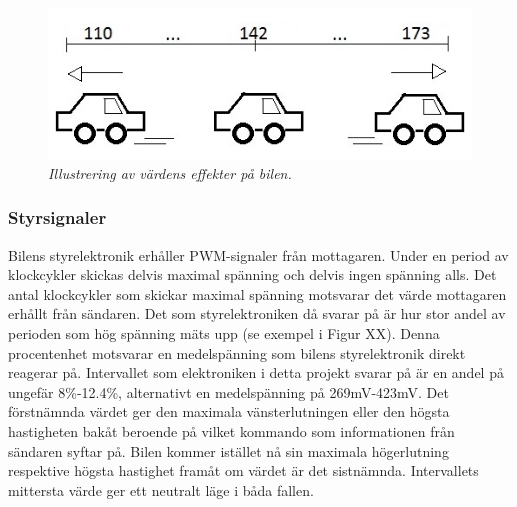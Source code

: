 \documentclass[a4paper]{article}
\begin{document}

\begin{figure}[H]
\includegraphics[scale=1]{110-173Car.jpg}
\centering
\caption{\it Illustrering av värdens effekter på bilen.}
\end{figure} 




\subsubsection{Styrsignaler}

Bilens styrelektronik erhåller PWM-signaler från mottagaren. Under en period av klockcykler skickas delvis maximal spänning och delvis ingen spänning alls. Det antal klockcykler som skickar maximal spänning motsvarar det värde mottagaren erhållt från sändaren. Det som styrelektroniken då svarar på är hur stor andel av perioden som hög spänning mäts upp (se exempel i Figur XX). Denna procentenhet motsvarar en medelspänning som bilens styrelektronik direkt reagerar på. Intervallet som elektroniken i detta projekt svarar på är en andel på ungefär 8\%-12.4\%, alternativt en medelspänning på 269mV-423mV. Det förstnämnda värdet ger den maximala vänsterlutningen eller den högsta hastigheten bakåt beroende på vilket kommando som informationen från sändaren syftar på. Bilen kommer istället nå sin maximala högerlutning respektive högsta hastighet framåt om värdet är det sistnämnda. Intervallets mittersta värde ger ett neutralt läge i båda fallen.
\end{document}

